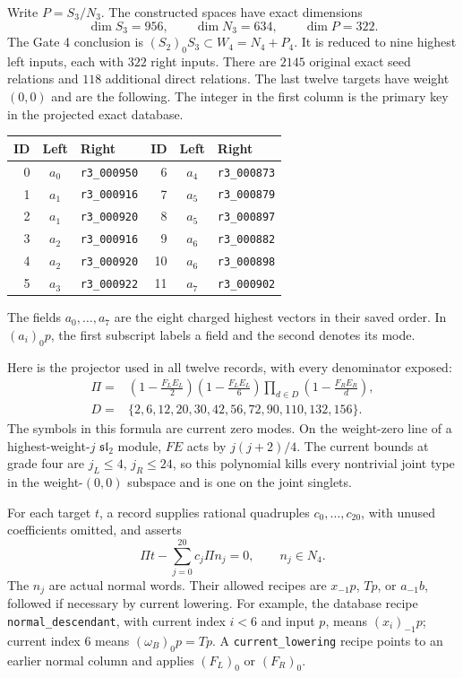 Write $P=S_3/N_3$.  The constructed spaces have exact dimensions
\[
           \dim S_3=956,\qquad \dim N_3=634,
                   \qquad \dim P=322.
\]
The Gate 4 conclusion is $(S_2)_0S_3\subset W_4=N_4+P_4$.
It is reduced to nine highest left inputs, each with $322$ right
inputs.  There are $2145$ original exact seed relations and $118$
additional direct relations.  The last twelve targets have weight
$(0,0)$ and are the following.  The integer in the first column is
the primary key in the projected exact database.
\begin{center}
\begin{tabular}{rcl@{\qquad}rcl}
\toprule
ID&Left&Right&ID&Left&Right\\
\midrule
0&$a_0$&\texttt{r3\_000950}&6&$a_4$&\texttt{r3\_000873}\\
1&$a_1$&\texttt{r3\_000916}&7&$a_5$&\texttt{r3\_000879}\\
2&$a_1$&\texttt{r3\_000920}&8&$a_5$&\texttt{r3\_000897}\\
3&$a_2$&\texttt{r3\_000916}&9&$a_6$&\texttt{r3\_000882}\\
4&$a_2$&\texttt{r3\_000920}&10&$a_6$&\texttt{r3\_000898}\\
5&$a_3$&\texttt{r3\_000922}&11&$a_7$&\texttt{r3\_000902}\\
\bottomrule
\end{tabular}
\end{center}
The fields $a_0,\ldots,a_7$ are the eight charged highest vectors in
their saved order.  In $(a_i)_0p$, the first subscript labels a field
and the second denotes its mode.

Here is the projector used in all twelve records, with every
denominator exposed:
\begin{align*}
 \Pi={}&\left(1-\frac{F_LE_L}{2}\right)
         \left(1-\frac{F_LE_L}{6}\right)
         \prod_{d\in D}\left(1-\frac{F_RE_R}{d}\right),\\
 D={}&\{2,6,12,20,30,42,56,72,90,110,132,156\}.
\end{align*}
The symbols in this formula are current zero modes.  On the
weight-zero line of a highest-weight-$j$ $\mathfrak{sl}_2$ module,
$FE$ acts by $j(j+2)/4$.  The current bounds at grade four are
$j_L\leq4$, $j_R\leq24$, so this polynomial kills every nontrivial
joint type in the weight-$(0,0)$ subspace and is one on the joint
singlets.

For each target $t$, a record supplies rational quadruples
$c_0,\ldots,c_{20}$, with unused coefficients omitted, and asserts
\begin{equation}\label{eq:reader-projected-residual}
           \Pi t-\sum_{j=0}^{20}c_j\Pi n_j=0,
                         \qquad n_j\in N_4.
\end{equation}
The $n_j$ are actual normal words.  Their allowed recipes are
$x_{-1}p$, $Tp$, or $a_{-1}b$, followed if necessary by current
lowering.  For example, the database recipe
\texttt{normal\_descendant}, with current index $i<6$ and input $p$,
means $(x_i)_{-1}p$; current index $6$ means $(\omega_B)_0p=Tp$.
A \texttt{current\_lowering} recipe points to an earlier normal
column and applies $(F_L)_0$ or $(F_R)_0$.

